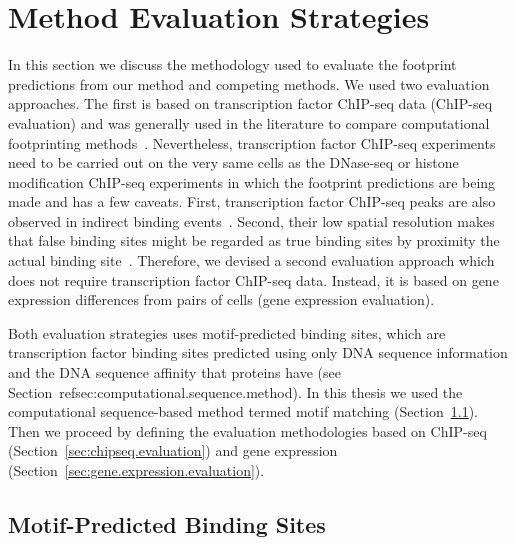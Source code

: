 \section{Method Evaluation Strategies}
\label{sec:method.evaluation.strategies}

In this section we discuss the methodology used to evaluate the footprint predictions from our method and competing methods. We used two evaluation approaches. The first is based on transcription factor ChIP-seq data (ChIP-seq evaluation) and was generally used in the literature to compare computational footprinting methods~\cite{pique2011,boyle2011,cuellar2012}. Nevertheless, transcription factor ChIP-seq experiments need to be carried out on the very same cells as the DNase-seq or histone modification ChIP-seq experiments in which the footprint predictions are being made and has a few caveats. First, transcription factor ChIP-seq peaks are also observed in indirect binding events~\cite{yardimci2014}. Second, their low spatial resolution makes that false binding sites might be regarded as true binding sites by proximity the actual binding site~\cite{cuellar2012,yardimci2014}. Therefore, we devised a second evaluation approach which does not require transcription factor ChIP-seq data. Instead, it is based on gene expression differences from pairs of cells (gene expression evaluation).

Both evaluation strategies uses motif-predicted binding sites, which are transcription factor binding sites predicted using only DNA sequence information and the DNA sequence affinity that proteins have (see Section~ref{sec:computational.sequence.method}). In this thesis we used the computational sequence-based method termed motif matching (Section~\ref{sec:motif.predicted.binding.sites}). Then we proceed by defining the evaluation methodologies based on ChIP-seq (Section~\ref{sec:chipseq.evaluation}) and gene expression (Section~\ref{sec:gene.expression.evaluation}).

\subsection{Motif-Predicted Binding Sites}
\label{sec:motif.predicted.binding.sites}


